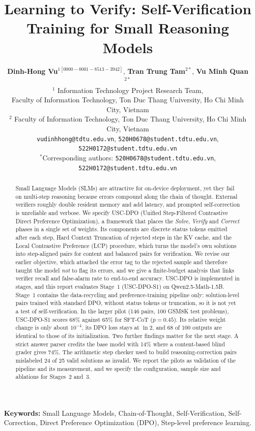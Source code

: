 \documentclass[11pt, a4paper]{article}
\title{\textbf{Learning to Verify: Self-Verification Training for Small Reasoning Models}}
\author{
    \textbf{Dinh-Hong Vu}$^{1[0000-0001-8513-3942]}$,
    \textbf{Tran Trung Tam}$^{2*}$,
    \textbf{Vu Minh Quan}$^{2*}$\\
    \small $^{1}$ Information Technology Project Research Team,\\
    \small Faculty of Information Technology, Ton Duc Thang University, Ho Chi Minh City, Vietnam\\
    \small $^{2}$ Faculty of Information Technology, Ton Duc Thang University, Ho Chi Minh City, Vietnam\\
    \small \texttt{vudinhhong@tdtu.edu.vn}, \texttt{520H0678@student.tdtu.edu.vn}, \texttt{522H0172@student.tdtu.edu.vn}\\
    \small $^*$Corresponding authors: \texttt{520H0678@student.tdtu.edu.vn}, \texttt{522H0172@student.tdtu.edu.vn}
}
\date{}
\newcommand{\soldpo}{USC-DPO-S1}
\begin{document}
\maketitle

\begin{abstract}
Small Language Models (SLMs) are attractive for on-device deployment, yet they fail on multi-step reasoning because errors compound along the chain of thought. External verifiers roughly double resident memory and add latency, and prompted self-correction is unreliable and verbose. We specify USC-DPO (Unified Step-Filtered Contrastive Direct Preference Optimization), a framework that places the \textit{Solve}, \textit{Verify} and \textit{Correct} phases in a single set of weights. Its components are discrete status tokens emitted after each step, Hard Context Truncation of rejected steps in the KV cache, and the Local Contrastive Preference (LCP) procedure, which turns the model's own solutions into step-aligned pairs for content and balanced pairs for verification. We revise our earlier objective, which attached the error tag to the rejected sample and therefore taught the model \emph{not} to flag its errors, and we give a finite-budget analysis that links verifier recall and false-alarm rate to end-to-end accuracy. USC-DPO is implemented in stages, and this report evaluates Stage~1 (\soldpo{}) on Qwen2.5-Math-1.5B. Stage~1 contains the data-recycling and preference-training pipeline only: solution-level pairs trained with standard DPO, without status tokens or truncation, so it is not yet a test of self-verification. In the larger pilot (146 pairs, 100 GSM8K test problems), \soldpo{} scores 68\% against 65\% for SFT-CoT ($p=0.45$). Its relative weight change is only about $10^{-4}$, its DPO loss stays at $\ln 2$, and 68 of 100 outputs are identical to those of its initialization. Two further findings matter for the next stage. A strict answer parser credits the base model with 14\% where a content-based blind grader gives 74\%. The arithmetic step checker used to build reasoning-correction pairs mislabeled 24 of 25 valid solutions as invalid. We report the pilots as validation of the pipeline and its measurement, and we specify the configuration, sample size and ablations for Stages~2 and~3.
\end{abstract}

\noindent\textbf{Keywords:} Small Language Models, Chain-of-Thought, Self-Verification, Self-Correction, Direct Preference Optimization (DPO), Step-level preference learning.
\end{document}
